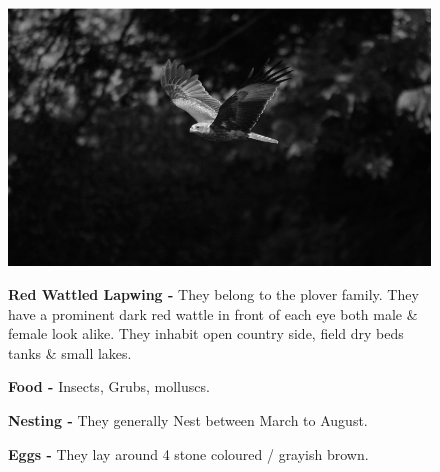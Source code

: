 \begin{figure}[H]
\begin{center}
\includegraphics{figure/Land_birds/01_pariah_kite/pariah-kite.eps}
\end{center}
\medskip
\noindent
{\bf Red Wattled Lapwing -} They belong to the plover family. They have a prominent dark red wattle in front of each eye both male \& female look alike. They inhabit open country side, field dry beds tanks \& small lakes.


\medskip
{\bf Food -} Insects, Grubs, molluscs.

{\bf Nesting -} They generally Nest between March to August.

{\bf Eggs -} They lay around 4 stone coloured / grayish brown.

\end{figure}

\vfill\eject

~\phantom{a}
\vfill

